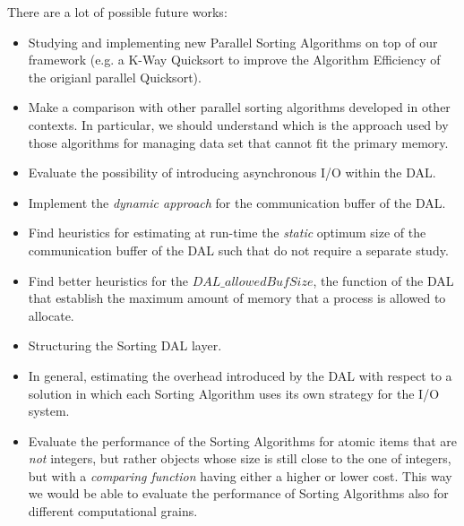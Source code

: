 There are a lot of possible future works:  
\begin{itemize}
\item Studying and implementing new Parallel Sorting Algorithms on top of our framework (e.g. a K-Way Quicksort to improve the Algorithm Efficiency of the origianl parallel Quicksort).
\item Make a comparison with other parallel sorting algorithms developed in other contexts. In particular, we should understand which is the approach used by those algorithms for managing data set that cannot fit the primary memory.
\item Evaluate the possibility of introducing asynchronous I/O within the DAL.
\item Implement the \textit{dynamic approach} for the communication buffer of the DAL.
\item Find heuristics for estimating at run-time the \textit{static} optimum size of the communication buffer of the DAL such that do not require a separate study.
\item Find better heuristics for the $DAL\_allowedBufSize$, the function of the DAL that establish the maximum amount of memory that a process is allowed to allocate.
\item Structuring the Sorting DAL layer.
\item In general, estimating the overhead introduced by the DAL with respect to a solution in which each Sorting Algorithm uses its own strategy for the I/O system.
\item Evaluate the performance of the Sorting Algorithms for atomic items that are \textit{not} integers, but rather objects whose size is still close to the one of integers, but with a \textit{comparing function} having either a higher or lower cost. This way we would be able to evaluate the performance of Sorting Algorithms also for different computational grains.
\end{itemize}